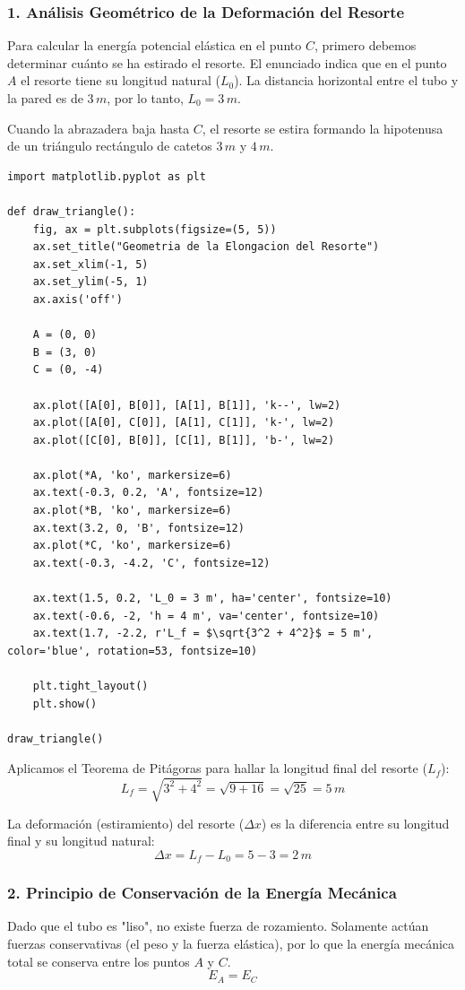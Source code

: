 \documentclass[12pt, a4paper]{article}
\begin{document}
\subsubsection*{1. Análisis Geométrico de la Deformación del Resorte}
Para calcular la energía potencial elástica en el punto $C$, primero debemos determinar cuánto se ha estirado el resorte. 
El enunciado indica que en el punto $A$ el resorte tiene su longitud natural ($L_0$). La distancia horizontal entre el tubo y la pared es de $3 \, \si{m}$, por lo tanto, $L_0 = 3 \, \si{m}$.

Cuando la abrazadera baja hasta $C$, el resorte se estira formando la hipotenusa de un triángulo rectángulo de catetos $3 \, \si{m}$ y $4 \, \si{m}$.

\begin{lstlisting}
import matplotlib.pyplot as plt

def draw_triangle():
    fig, ax = plt.subplots(figsize=(5, 5))
    ax.set_title("Geometria de la Elongacion del Resorte")
    ax.set_xlim(-1, 5)
    ax.set_ylim(-5, 1)
    ax.axis('off')
    
    A = (0, 0)
    B = (3, 0)
    C = (0, -4)
    
    ax.plot([A[0], B[0]], [A[1], B[1]], 'k--', lw=2)
    ax.plot([A[0], C[0]], [A[1], C[1]], 'k-', lw=2)
    ax.plot([C[0], B[0]], [C[1], B[1]], 'b-', lw=2)
    
    ax.plot(*A, 'ko', markersize=6)
    ax.text(-0.3, 0.2, 'A', fontsize=12)
    ax.plot(*B, 'ko', markersize=6)
    ax.text(3.2, 0, 'B', fontsize=12)
    ax.plot(*C, 'ko', markersize=6)
    ax.text(-0.3, -4.2, 'C', fontsize=12)
    
    ax.text(1.5, 0.2, 'L_0 = 3 m', ha='center', fontsize=10)
    ax.text(-0.6, -2, 'h = 4 m', va='center', fontsize=10)
    ax.text(1.7, -2.2, r'L_f = $\sqrt{3^2 + 4^2}$ = 5 m', color='blue', rotation=53, fontsize=10)
    
    plt.tight_layout()
    plt.show()

draw_triangle()
\end{lstlisting}

Aplicamos el Teorema de Pitágoras para hallar la longitud final del resorte ($L_f$):
$$ L_f = \sqrt{3^2 + 4^2} = \sqrt{9 + 16} = \sqrt{25} = 5 \, \si{m} $$

La deformación (estiramiento) del resorte ($\Delta x$) es la diferencia entre su longitud final y su longitud natural:
$$ \Delta x = L_f - L_0 = 5 - 3 = 2 \, \si{m} $$

\subsubsection*{2. Principio de Conservación de la Energía Mecánica}
Dado que el tubo es "liso", no existe fuerza de rozamiento. Solamente actúan fuerzas conservativas (el peso y la fuerza elástica), por lo que la energía mecánica total se conserva entre los puntos $A$ y $C$.
$$ E_A = E_C $$
\end{document}

